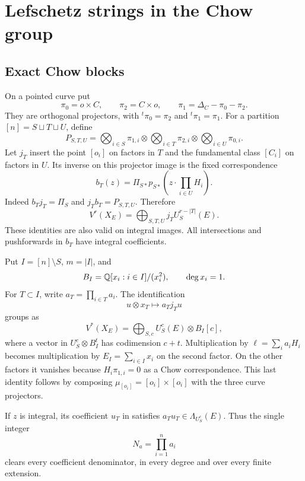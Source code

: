 \section{Lefschetz strings in the Chow group}\label{sec:lefschetz}

\subsection{Exact Chow blocks}\label{sec:chow-blocks}

On a pointed curve put
\[
 \pi_0=o\times C,\qquad \pi_2=C\times o,\qquad
 \pi_1=\Delta_C-\pi_0-\pi_2.
\]
They are orthogonal projectors, with
\({}^t\pi_0=\pi_2\) and \({}^t\pi_1=\pi_1\). For a partition
\([n]=S\sqcup T\sqcup U\), define
\[
 P_{S,T,U}=\bigotimes_{i\in S}\pi_{1,i}
            \otimes\bigotimes_{i\in T}\pi_{2,i}
            \otimes\bigotimes_{i\in U}\pi_{0,i}.
\]
Let \(j_T\) insert the point \([o_i]\) on factors in \(T\) and
the fundamental class \([C_i]\) on factors in \(U\). Its inverse
on this projector image is the fixed correspondence
\[
 b_T(z)=\Pi_{S*}p_{S*}
           \left(z\cdot\prod_{i\in U}H_i\right).
\]
Indeed \(b_Tj_T=\Pi_S\) and \(j_Tb_T=P_{S,T,U}\). Therefore
\begin{equation}\label{eq:chow-decomposition}
 V^r(X_E)=\bigoplus_{S,T,U}j_TU_S^{r-|T|}(E).
\end{equation}
These identities are also valid on integral images. All intersections
and pushforwards in \(b_T\) have integral coefficients.

Put \(I=[n]\setminus S\), \(m=|I|\), and
\[
 B_I=\mathbb Q[x_i:i\in I]/(x_i^2),\qquad \deg x_i=1.
\]
For \(T\subset I\), write \(a_T=\prod_{i\in T}a_i\). The
identification
\begin{equation}\label{eq:weighted-chow-block}
 u\otimes x_T\longmapsto a_Tj_Tu
\end{equation}
groups  as
\[
 V^*(X_E)=\bigoplus_{S,c} U_S^c(E)\otimes B_I[c],
\]
where a vector in \(U_S^c\otimes B_I^t\) has codimension \(c+t\).
Multiplication by \(\ell=\sum_i a_iH_i\) becomes multiplication
by \(E_I=\sum_{i\in I}x_i\) on the second factor. On the other
factors it vanishes because \(H_i\pi_{1,i}=0\) as a Chow
correspondence. This last identity follows by composing
\(\mu_{[o_i]}=[o_i]\times[o_i]\) with the three curve projectors.

If \(z\) is integral, its coefficient \(u_T\) in
 satisfies
\(a_Tu_T\in\Lambda_{U_S^c}(E)\). Thus the single integer
\begin{equation}\label{eq:coordinate-denominator}
 N_a=\prod_{i=1}^n a_i
\end{equation}
clears every coefficient denominator, in every degree and over every
finite extension.

